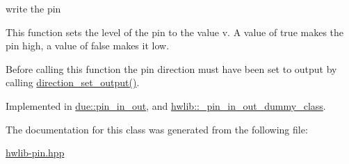 write the pin 

This function sets the level of the pin to the value v. A value of true makes the pin high, a value of false makes it low.

Before calling this function the pin direction must have been set to output by calling \hyperlink{classhwlib_1_1pin__in__out_ad08a5f5e9a4c3aadaa7c665b98f2418e}{direction\+\_\+set\+\_\+output()}. 

Implemented in \hyperlink{classdue_1_1pin__in__out_ad3a74cb13af59d4a5be3cc40a8f894b8}{due\+::pin\+\_\+in\+\_\+out}, and \hyperlink{classhwlib_1_1__pin__in__out__dummy__class_afd92206adb4c05526a84d8e7ff17491c}{hwlib\+::\+\_\+pin\+\_\+in\+\_\+out\+\_\+dummy\+\_\+class}.



The documentation for this class was generated from the following file\+:\begin{DoxyCompactItemize}
\item 
\hyperlink{hwlib-pin_8hpp}{hwlib-\/pin.\+hpp}\end{DoxyCompactItemize}
